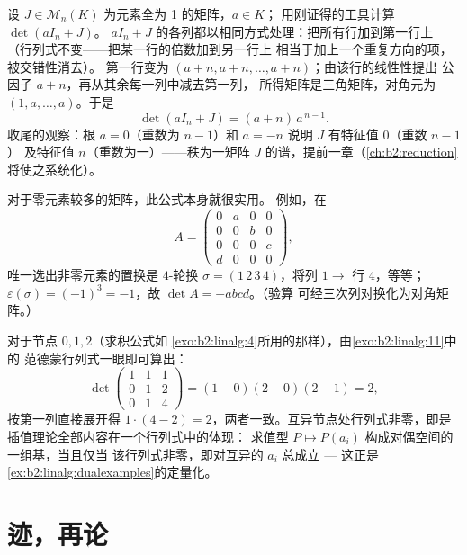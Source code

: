 \begin{example}[用运算法则计算行列式]\label{ex:b2:linalg:onesmatrix}
设 $J \in \mathcal{M}_n(K)$ 为元素全为 1 的矩阵，$a \in K$；
用刚证得的工具计算 $\det(aI_n + J)$。
$aI_n + J$ 的各列都以相同方式处理：把所有行加到第一行上
（行列式不变——把某一行的倍数加到另一行上
相当于加上一个重复方向的项，被交错性消去）。
第一行变为 $(a + n, a + n, \dots, a + n)$；由该行的线性性提出
公因子 $a + n$，再从其余每一列中减去第一列，
所得矩阵是三角矩阵，对角元为
$(1, a, \dots, a)$。于是
\[
\det(aI_n + J) = (a + n)\,a^{\,n-1}.
\]
收尾的观察：根 $a = 0$（重数为 $n - 1$）和
$a = -n$ 说明 $J$ 有特征值 $0$（重数 $n - 1$）
及特征值 $n$（重数为一）——秩为一矩阵
$J$ 的谱，提前一章（\cref{ch:b2:reduction}
将使之系统化）。
\end{example}

\begin{example}[用置换公式计算行列式]\label{ex:b2:linalg:permexample}
对于零元素较多的矩阵，此公式本身就很实用。
例如，在
\[
A = \begin{pmatrix}
0 & a & 0 & 0\\
0 & 0 & b & 0\\
0 & 0 & 0 & c\\
d & 0 & 0 & 0
\end{pmatrix},
\]
唯一选出非零元素的置换是 $4$-轮换
$\sigma = (1\,2\,3\,4)$，将列 $1 \to$ 行 $4$，等等；
$\varepsilon(\sigma) = (-1)^3 = -1$，故 $\det A = -abcd$。（验算
可经三次列对换化为对角矩阵。）
\end{example}

\begin{example}[用乘积公式计算范德蒙行列式]\label{ex:b2:linalg:vandermondework}
对于节点 $0, 1, 2$（求积公式如
\cref{exo:b2:linalg:4}所用的那样），由\cref{exo:b2:linalg:11}中的
范德蒙行列式一眼即可算出：
\[
\det\begin{pmatrix}
1 & 1 & 1\\
0 & 1 & 2\\
0 & 1 & 4
\end{pmatrix}
= (1 - 0)(2 - 0)(2 - 1) = 2 ,
\]
按第一列直接展开得 $1\cdot(4 - 2)
= 2$，两者一致。互异节点处行列式非零，即是
插值理论全部内容在一个行列式中的体现：
求值型 $P \mapsto P(a_i)$ 构成对偶空间的一组基，当且仅当
该行列式非零，即对互异的 $a_i$ 总成立
--- 这正是\cref{ex:b2:linalg:dualexamples}的定量化。
\end{example}

\section{迹，再论}

